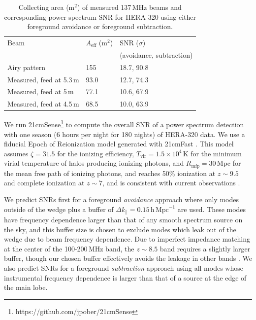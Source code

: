 \documentclass{emulateapj}
\begin{document}
 \begin{table}[h]
 \caption{ \label{table:collectingareatable}Collecting area (m$^2$) of measured 137\,MHz beams and corresponding power spectrum SNR for HERA-320 using either foreground avoidance or foreground subtraction.}
\begin{tabular}{| l | l | l |}
\hline
Beam & $A_\text{eff}$ (m$^2$) & SNR ($\sigma$)\\
&& (avoidance, subtraction)\\
\hline
  Airy pattern & 155 & 18.7, 90.8  \\
    Measured, feed at 5.3\,m & 93.0 & 12.7, 74.3 \\
    Measured, feed at 5\,m & 77.1 &  10.6, 67.9 \\
    Measured, feed at 4.5\,m & 68.5 &  10.0, 63.9 \\ 
  \hline
\end{tabular}
\end{table}

We run 21cmSense\footnote{https://github.com/jpober/21cmSense} to compute the overall SNR of a power spectrum detection with one season (6 hours per night for 180 nights) of HERA-320 data. We use a fiducial Epoch of Reionization model generated with 21cmFast \citep{21cmfast}. This model assumes $\zeta=31.5$ for the ionizing efficiency, $T_\mathrm{vir}=1.5\times10^4$\,K for the minimum virial temperature of halos producing ionizing photons, and $R_\text{mfp}=30$\,Mpc for the mean free path of ionizing photons, and reaches 50\% ionization at $z \sim 9.5$ and complete ionization at $z \sim 7$, and is consistent with current observations \citep[e.g.][]{PoberNextGen}. 

We predict SNRs first for a foreground \textit{avoidance} approach where only modes outside of the wedge plus a buffer of $\Delta k_\parallel=0.15\,\mathrm{h}\,\mathrm{Mpc}^{-1}$ are used. These modes have frequency dependence larger than that of any smooth spectrum source on the sky, and this buffer size is chosen to exclude modes which leak out of the wedge due to beam frequency dependence. Due to imperfect impedance matching at the center of the 100-200\,MHz band, the $z\sim8.5$ band requires a slightly larger buffer, though our chosen buffer effectively avoids the leakage in other bands \citep{ewallwice16}. We also predict SNRs for a foreground \textit{subtraction} approach using all modes whose instrumental frequency dependence is larger than that of a source at the edge of the main lobe. 
\end{document}
